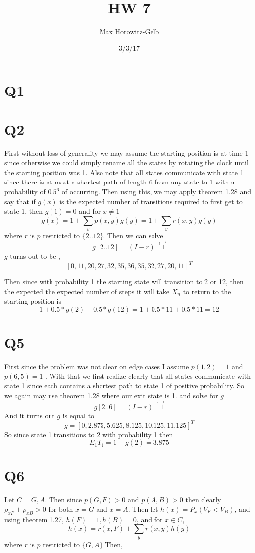 \documentclass{article}
\title{HW 7}
\author{Max Horowitz-Gelb}
\date{3/3/17}
\begin{document}
\maketitle
\section*{Q1}
\section*{Q2}
First without loss of generality we may assume the starting position is at time 1 since otherwise we could simply rename all the states by rotating the clock until the starting position was 1. Also note that all states communicate with state 1 since there is at most a shortest path of length 6 from any state to 1 with a probability of $0.5^{6}$ of occurring.
Then using this, we may apply theorem 1.28 and say that
if $g(x)$ is the expected number of transitions required to first get to state 1, then
$g(1) = 0$ and for $x \neq 1$
\[
g(x) = 1 + \sum_y p(x,y)g(y) = 1 + \sum_y r(x,y)g(y)
\]
where $r$ is $p$ restricted to $\{2 .. 12\}$.
Then we can solve
\[
g[2 .. 12] = (I - r)^{-1} \vec{1}
\]
$g$ turns out to be ,
\[
[0, 11,  20,  27,  32,  35,  36,  35,  32,  27,  20,  11]^T
\]

Then since with probability 1 the starting state will transition to 2 or 12, then the expected the expected number of steps it will take $X_n$ to return to the starting position is
\[
1 + 0.5 * g(2) + 0.5 * g(12) = 1 + 0.5 * 11 + 0.5 * 11 = 12
\]

\section*{Q5}
First since the problem was not clear on edge cases I assume $p(1,2) = 1$ and $p(6,5) = 1$ . With that we first realize clearly that all states communicate with state 1 since each contains a shortest path to state 1 of positive probability. 
So we again may use theorem 1.28 where our exit state is 1. 
and solve for $g$
\[
g[2 .. 6] = (I - r)^{-1} \vec{1}
\]
And it turns out $g$ is equal to 
\[
g = [0 , 2.875,   5.625,   8.125,  10.125,  11.125]^T
\]
So since state 1 transitions to 2 with probability 1 then
\[
E_1T_1 = 1 + g(2) = 3.875
\]

\section*{Q6}
Let $C = {G,A}$. Then since $p(G,F) > 0$ and $p(A,B) > 0$ then clearly $\rho_{xF} + \rho_{xB} > 0 $ for both $x = G$ and $x= A$.
Then let $h(x) = P_x(V_F < V_B)$, and using theorem 1.27,
$h(F) = 1, h(B) = 0$, and for $x \in C$,
\[
h(x) = r(x,F) + \sum_y r(x,y)h(y)
\]
where $r$ is $p$ restricted to $\{G,A\}$
Then,
\end{document}
